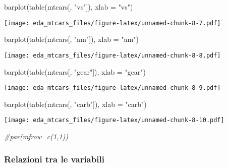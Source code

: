 \documentclass[
]{article}
\newenvironment{Shaded}{\begin{snugshade}}{\end{snugshade}}
\newcommand{\AttributeTok}[1]{\textcolor[rgb]{0.77,0.63,0.00}{#1}}
\newcommand{\CommentTok}[1]{\textcolor[rgb]{0.56,0.35,0.01}{\textit{#1}}}
\newcommand{\FunctionTok}[1]{\textcolor[rgb]{0.00,0.00,0.00}{#1}}
\newcommand{\NormalTok}[1]{#1}
\newcommand{\StringTok}[1]{\textcolor[rgb]{0.31,0.60,0.02}{#1}}
\begin{document}
\begin{Shaded}
\begin{Highlighting}[]
\FunctionTok{barplot}\NormalTok{(}\FunctionTok{table}\NormalTok{(mtcars[, }\StringTok{"vs"}\NormalTok{]), }\AttributeTok{xlab =} \StringTok{"vs"}\NormalTok{)}
\end{Highlighting}
\end{Shaded}

\texttt{[image: eda\_mtcars\_files/figure-latex/unnamed-chunk-8-7.pdf]}

\begin{Shaded}
\begin{Highlighting}[]
\FunctionTok{barplot}\NormalTok{(}\FunctionTok{table}\NormalTok{(mtcars[, }\StringTok{"am"}\NormalTok{]), }\AttributeTok{xlab =} \StringTok{"am"}\NormalTok{)}
\end{Highlighting}
\end{Shaded}

\texttt{[image: eda\_mtcars\_files/figure-latex/unnamed-chunk-8-8.pdf]}

\begin{Shaded}
\begin{Highlighting}[]
\FunctionTok{barplot}\NormalTok{(}\FunctionTok{table}\NormalTok{(mtcars[, }\StringTok{"gear"}\NormalTok{]), }\AttributeTok{xlab =} \StringTok{"gear"}\NormalTok{)}
\end{Highlighting}
\end{Shaded}

\texttt{[image: eda\_mtcars\_files/figure-latex/unnamed-chunk-8-9.pdf]}

\begin{Shaded}
\begin{Highlighting}[]
\FunctionTok{barplot}\NormalTok{(}\FunctionTok{table}\NormalTok{(mtcars[, }\StringTok{"carb"}\NormalTok{]), }\AttributeTok{xlab =} \StringTok{"carb"}\NormalTok{)}
\end{Highlighting}
\end{Shaded}

\texttt{[image: eda\_mtcars\_files/figure-latex/unnamed-chunk-8-10.pdf]}

\begin{Shaded}
\begin{Highlighting}[]
\CommentTok{\#par(mfrow=c(1,1))}
\end{Highlighting}
\end{Shaded}

\hypertarget{relazioni-tra-le-variabili}{%
\subsubsection{Relazioni tra le
variabili}\label{relazioni-tra-le-variabili}}
\end{document}
